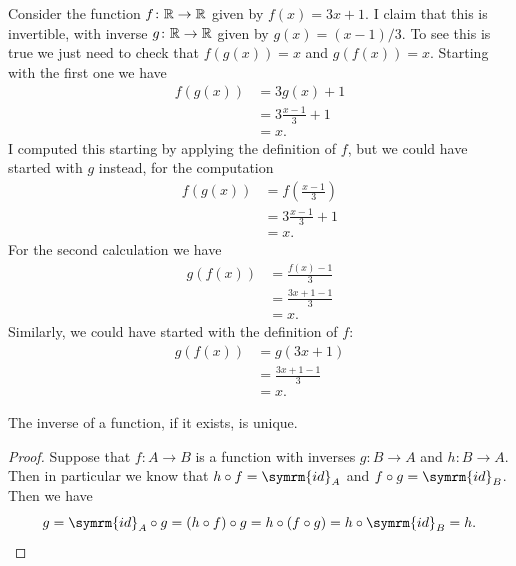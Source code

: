 \documentclass[fleqn]{LectureClass/LectureClass}
\newcommand{\id}{\symrm{id}}
\begin{document}
    \begin{exm}{}{}
        Consider the function \(f \colon \mathbb{R} \to \mathbb{R}\) given by \(f(x) = 3x + 1\).
        I claim that this is invertible, with inverse \(g\colon \mathbb{R} \to \mathbb{R}\) given by \(g(x) = (x - 1)/3\).
        To see this is true we just need to check that \(f(g(x)) = x\) and \(g(f(x)) = x\).
        Starting with the first one we have
        \begin{align}
            f(g(x)) &= 3g(x) + 1\\
            &= 3 \frac{x - 1}{3} + 1\\
            &= x.
        \end{align}
        I computed this starting by applying the definition of \(f\), but we could have started with \(g\) instead, for the computation
        \begin{align}
            f(g(x)) &= f\left( \frac{x - 1}{3} \right)\\
            &= 3\frac{x - 1}{3} + 1\\
            &= x.
        \end{align}
        For the second calculation we have
        \begin{align}
            g(f(x)) &= \frac{f(x) - 1}{3}\\
            &= \frac{3x + 1 - 1}{3}\\
            &= x.
        \end{align}
        Similarly, we could have started with the definition of \(f\):
        \begin{align}
            g(f(x)) &= g(3x + 1)\\
            &= \frac{3x + 1 - 1}{3}\\
            &= x.
        \end{align}
    \end{exm}
    
    \begin{lma}{}{}
        The inverse of a function, if it exists, is unique.
        \begin{proof}
            Suppose that \(f \colon A \to B\) is a function with inverses \(g \colon B \to A\) and \(h \colon B \to A\).
            Then in particular we know that \(h \circ f = \id_A\) and \(f \circ g = \id_B\).
            Then we have
            \begin{equation*}
                g = \id_A \circ g = (h \circ f) \circ g = h \circ (f \circ g) = h \circ \id_B = h. \qedhere
            \end{equation*}
        \end{proof}
    \end{lma}
    
\end{document}
